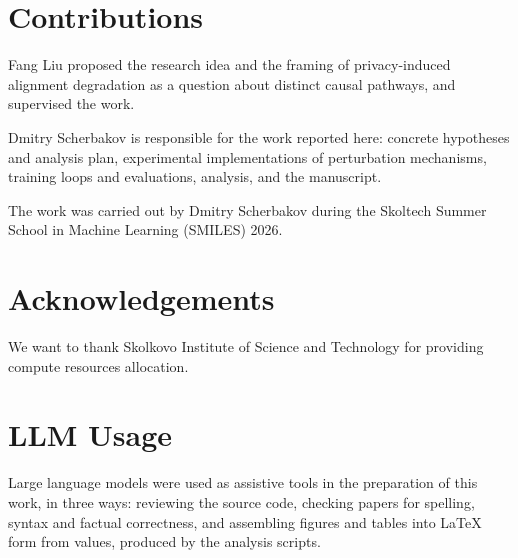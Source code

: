 \section*{Contributions}
Fang Liu proposed the research idea and the framing of privacy-induced alignment degradation as a question about distinct causal pathways, and supervised the work.

Dmitry Scherbakov is responsible for the work reported here:
concrete hypotheses and analysis plan,
experimental implementations of perturbation mechanisms,
training loops and evaluations,
analysis,
and the manuscript.

The work was carried out by Dmitry Scherbakov during the Skoltech Summer School in Machine Learning (SMILES) 2026.

\section*{Acknowledgements}
We want to thank Skolkovo Institute of Science and Technology for providing compute resources allocation.

\section*{LLM Usage}
Large language models were used as assistive tools in the preparation of this work,
in three ways:
reviewing the source code,
checking papers for spelling,
syntax and factual correctness,
and assembling figures and tables into \LaTeX{} form from values,
produced by the analysis scripts.
